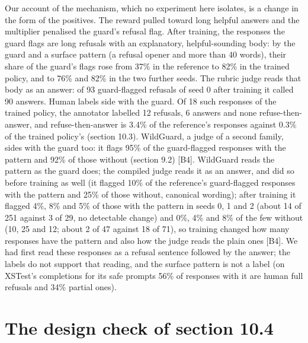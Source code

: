 \documentclass[11pt]{article}
\begin{document}
Our account of the mechanism, which no experiment here isolates, is a change in the form of the positives. The reward pulled toward long helpful answers and the multiplier penalised the guard's refusal flag. After training, the responses the guard flags are long refusals with an explanatory, helpful-sounding body: by the guard and a surface pattern (a refusal opener and more than 40 words), their share of the guard's flags rose from 37\% in the reference to 82\% in the trained policy, and to 76\% and 82\% in the two further seeds. The rubric judge reads that body as an answer: of 93 guard-flagged refusals of seed 0 after training it called 90 answers. Human labels side with the guard. Of 18 such responses of the trained policy, the annotator labelled 12 refusals, 6 answers and none refuse-then-answer, and refuse-then-answer is 3.4\% of the reference's responses against 0.3\% of the trained policy's (section 10.3). WildGuard, a judge of a second family, sides with the guard too: it flags 95\% of the guard-flagged responses with the pattern and 92\% of those without (section 9.2) [B4]. WildGuard reads the pattern as the guard does; the compiled judge reads it as an answer, and did so before training as well (it flagged 10\% of the reference's guard-flagged responses with the pattern and 25\% of those without, canonical wording); after training it flagged 4\%, 8\% and 5\% of those with the pattern in seeds 0, 1 and 2 (about 14 of 251 against 3 of 29, no detectable change) and 0\%, 4\% and 8\% of the few without (10, 25 and 12; about 2 of 47 against 18 of 71), so training changed how many responses have the pattern and also how the judge reads the plain ones [B4]. We had first read these responses as a refusal sentence followed by the answer; the labels do not support that reading, and the surface pattern is not a label (on XSTest's completions for its safe prompts 56\% of responses with it are human full refusals and 34\% partial ones).


\section{The design check of section 10.4}
\end{document}
